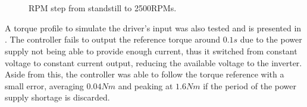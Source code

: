 \begin{figure}[!htb]
	\centering
	\\
	\\
	\caption{RPM step from standstill to 2500RPMs.}
	\label{fig:speed_step_fig} %
\end{figure}

A torque profile to simulate the driver's input was also tested and is presented in . The controller fails to output the reference torque around $0.1s$ due to the power supply not being able to provide enough current, thus it switched from constant voltage to constant current output, reducing the available voltage to the inverter. Aside from this, the controller was able to follow the torque reference with a small error, averaging $0.04Nm$ and peaking at $1.6Nm$ if the period of the power supply shortage is discarded.


